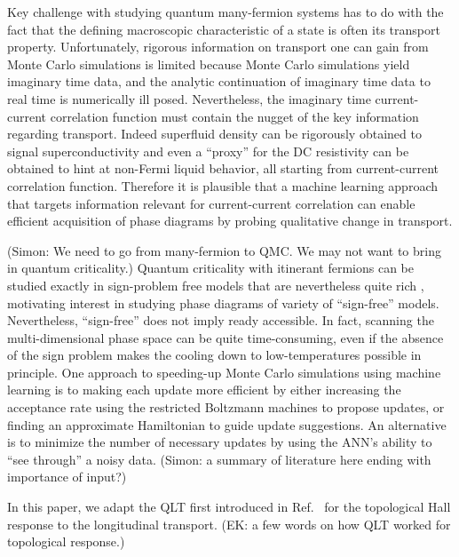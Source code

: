 \documentclass[amsmath,amssymb, aps, prl, twocolumn]{revtex4-1}
\begin{document}
\vskip 2cm





Key challenge with studying quantum many-fermion systems has to do with the fact that the defining macroscopic characteristic of a state is often its transport property. Unfortunately, 
rigorous information on transport one can gain from Monte Carlo simulations is limited because Monte Carlo simulations yield imaginary time data, and the analytic continuation of imaginary time data to real time is numerically ill posed. Nevertheless, the imaginary time current-current correlation function must contain the nugget of the key information regarding transport. Indeed 
superfluid density can be rigorously obtained to signal superconductivity\cite{Scalapino1992,Scalapino1993} and even a “proxy” for the DC resistivity can be obtained to hint at non-Fermi liquid behavior\cite{Lederer2017}, all starting from current-current correlation function. Therefore it is plausible that a machine learning approach that targets information relevant for current-current correlation can enable efficient acquisition of phase diagrams by probing qualitative change in transport.

{\color{red} (Simon: We need to go from many-fermion to QMC. We may not want to bring in quantum criticality.)} Quantum criticality with itinerant fermions can be studied exactly in sign-problem free models that are nevertheless quite rich \cite{Berg2012,Schattner2016a,Gerlach2017,Xu2017a,Lederer2017,Li2016,Li2017,Jiang2017,Berg2018}, motivating interest in studying phase diagrams of variety of  “sign-free” models. Nevertheless, ``sign-free'' does not imply ready accessible. 
In fact, scanning the multi-dimensional phase space can be quite time-consuming, even if the absence of the sign problem makes the cooling down to low-temperatures possible in principle. One approach to speeding-up Monte Carlo simulations using machine learning is to making each update more efficient by either increasing the acceptance rate using the restricted Boltzmann machines to propose updates\cite{Huang2017}, or finding an approximate Hamiltonian to guide update suggestions\cite{Liu2017}. 
An alternative is to minimize the number of necessary updates by using the ANN’s ability to “see through” a noisy data. {\color{red} (Simon: a summary of literature here ending with importance of input?)}



In this paper, we adapt the QLT first introduced in Ref.~\cite{qlt2016} for the topological Hall response to the longitudinal transport.  {\color{red}(EK: a few words on how QLT worked for topological response.)}
\end{document}
